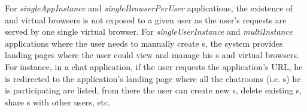 For \emph{singleAppInstance} and \emph{singleBrowserPerUser} applications,
the existence of \appins{} and virtual browsers is not exposed to a given user as
the user's requests are served by one single virtual browser.
For \emph{singleUserInstance} and \emph{multiInstance} applications where the user
needs to manually create \appins{}s,
the system provides landing pages where the user 
could view and manage his \appins{}s and virtual browsers.
For instance, in a chat application, if the user requests the application's URL,
he is redirected to the application's landing page where all the
 chatrooms (i.e. \appins{}s) he is participating are listed,
from there the user can create new \appins{}s, delete existing \appins{}s, share
\appins{}s with other users, etc.






